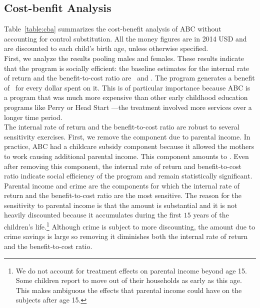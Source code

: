 \subsection{Cost-benfit Analysis} \label{section:cbaresults}

\noindent Table~\ref{table:cba} summarizes the cost-benefit analysis of ABC without accounting for control substitution. All the money figures are in 2014 USD and are discounted to each child's birth age, unless otherwise specified.\\

\noindent First, we analyze the results pooling males and females. These results indicate that the program is socially efficient: the baseline estimates for the internal rate of return and the benefit-to-cost ratio are \irrp\ and \bcp. The program generates a benefit of \bcp\ for every dollar spent on it. This is of particular importance because ABC is a program that was much more expensive than other early childhood education programs like Perry or Head Start \citep{Elango_Hojman_etal_2016_Early-Edu}---the treatment involved more services over a longer time period. \\ 

\noindent The internal rate of return and the benefit-to-cost ratio are robust to several sensitivity exercises. First, we remove the component due to parental income. In practice, ABC had a childcare subsidy component because it allowed the mothers to work causing additional parental income. This component amounts to \parincomenpvp. Even after removing this component, the internal rate of return and benefit-to-cost ratio indicate social efficiency of the program and remain statistically significant.\\ 

\noindent Parental income and crime are the components for which the internal rate of return and the benefit-to-cost ratio are the most sensitive. The reason for the sensitivity to parental income is that the amount is substantial and it is not heavily discounted because it accumulates during the first $15$ years of the children's life.\footnote{We do not account for treatment effects on parental income beyond age 15. Some children report to move out of their households as early as this age. This makes ambiguous the effects that parental income could have on the subjects after age 15.} Although crime is subject to more discounting, the amount due to crime savings is large so removing it diminishes both the internal rate of return and the benefit-to-cost ratio.\\ 

